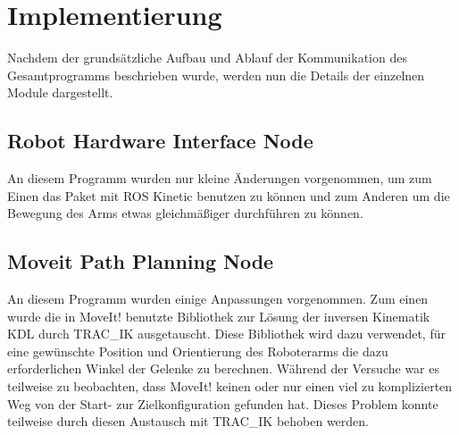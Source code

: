 \chapter{Implementierung}
\label{chap:implementierung}
Nachdem der grundsätzliche Aufbau und Ablauf der Kommunikation des Gesamtprogramms beschrieben wurde, werden nun die Details der einzelnen Module dargestellt.

\section{Robot Hardware Interface Node} %
\label{sec:robot_hardware_interface_node}
An diesem Programm wurden nur kleine Änderungen vorgenommen, um zum Einen das Paket mit ROS Kinetic benutzen zu können und zum Anderen um die Bewegung des Arms etwas gleichmäßiger durchführen zu können.

\section{Moveit Path Planning Node} %
\label{sec:universal_robot_impl}

An diesem Programm wurden einige Anpassungen vorgenommen. Zum einen wurde die in MoveIt! benutzte Bibliothek zur Lösung der inversen Kinematik KDL durch TRAC\_IK ausgetauscht. Diese Bibliothek wird dazu verwendet, für eine gewünschte Position und Orientierung des Roboterarms die dazu erforderlichen Winkel der Gelenke zu berechnen. Während der Versuche war es teilweise zu beobachten, dass MoveIt! keinen oder nur einen viel zu komplizierten Weg von der Start- zur Zielkonfiguration gefunden hat. Dieses Problem konnte teilweise durch diesen Austausch mit TRAC\_IK behoben werden.

